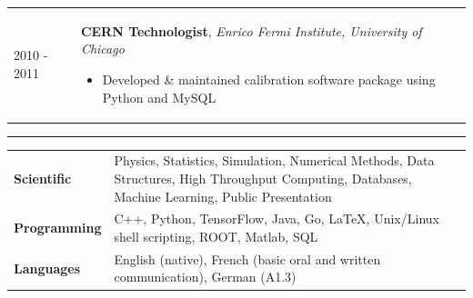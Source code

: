 \documentclass{letter}
\begin{document}
\begin{tabular}{p{}p{}}
  2010 - 2011
  &
  \textbf{CERN Technologist}, \textit{Enrico Fermi Institute, University of Chicago} \newline
  \vspace{-15pt}  %
  \begin{itemize}
    \itemsep0em
    \renewcommand{\labelitemi}{\tiny$\blacksquare$} 
    \item Developed \& maintained calibration software package using Python and MySQL
  \end{itemize}
\end{tabular}
\vspace{-10pt}


\begin{flushleft}
  \Large{\textsc{\textbf{\color{Maroon}{Skills}}}}
  \vspace{1pt}  %
  \hrule
\end{flushleft}

\begin{tabular}{p{}p{}}

  {\bf Scientific} 
  &
  Physics, Statistics, Simulation, Numerical Methods, Data Structures, High Throughput Computing, Databases, Machine Learning, Public Presentation \newline
  \\

  {\bf Programming} 
  &
  C++, Python, TensorFlow, Java, Go, \LaTeX{}, Unix/Linux shell scripting, ROOT, Matlab, SQL \newline
  \\ 

  {\bf Languages}
  &
  English (native), French (basic oral and written communication), German (A1.3)
\end{tabular}
\end{document}
